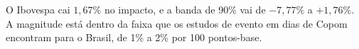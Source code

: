 \documentclass[
article,			%
12pt,				%
oneside,			%
a4paper,			%
hidelinks, 
english,			%
brazil,				%
]{abntex2}
\theoremstyle{plain}
\theoremstyle{definition}
\theoremstyle{remark}
\begin{document}
O Ibovespa cai $1{,}67\%$ no impacto, e a banda de 90\% vai de $-7{,}77\%$ a $+1{,}76\%$. A magnitude está dentro da faixa que os estudos de evento em dias de Copom encontram para o Brasil, de 1\% a 2\% por 100 pontos-base.





\end{document}
